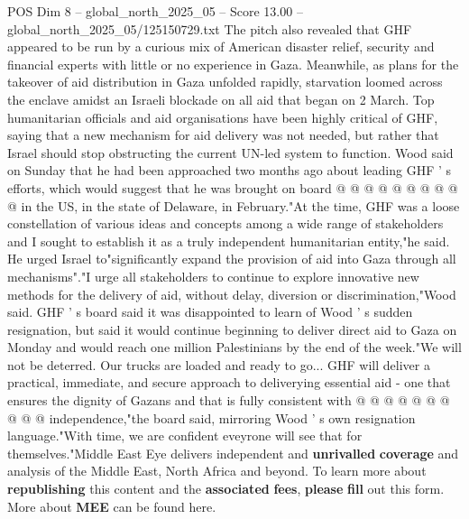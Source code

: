 \begin{textsample}{POS Dim 8 – global\_north\_2025\_05 – Score 13.00 – global\_north\_2025\_05/125150729.txt}
The pitch also revealed that GHF appeared to be run by a curious mix of American disaster relief, security and financial experts with little or no experience in Gaza.
Meanwhile, as plans for the takeover of aid distribution in Gaza unfolded rapidly, starvation loomed across the enclave amidst an Israeli blockade on all aid that began on 2 March.
Top humanitarian officials and aid organisations have been highly critical of GHF, saying that a new mechanism for aid delivery was not needed, but rather that Israel should stop obstructing the current UN-led system to function.
Wood said on Sunday that he had been approached two months ago about leading GHF ' s efforts, which would suggest that he was brought on board @ @ @ @ @ @ @ @ @ @ in the US, in the state of Delaware, in February."At the time, GHF was a loose constellation of various ideas and concepts among a wide range of stakeholders and I sought to establish it as a truly independent humanitarian entity,"he said.
He urged Israel to"significantly expand the provision of aid into Gaza through all mechanisms"."I urge all stakeholders to continue to explore innovative new methods for the delivery of aid, without delay, diversion or discrimination,"Wood said.
GHF ' s board said it was disappointed to learn of Wood ' s sudden resignation, but said it would continue beginning to deliver direct aid to Gaza on Monday and would reach one million Palestinians by the end of the week."We will not be deterred.
Our trucks are loaded and ready to go...
GHF will deliver a practical, immediate, and secure approach to deliverying essential aid - one that ensures the dignity of Gazans and that is fully consistent with @ @ @ @ @ @ @ @ @ @ independence,"the board said, mirroring Wood ' s own resignation language."With time, we are confident eveyrone will see that for themselves."Middle East Eye delivers independent and \textbf{unrivalled} \textbf{coverage} and analysis of the Middle East, North Africa and beyond.
To learn more about \textbf{republishing} this content and the \textbf{associated} \textbf{fees}, \textbf{please} \textbf{fill} out this form.
More about \textbf{MEE} can be found here.

\end{textsample}
